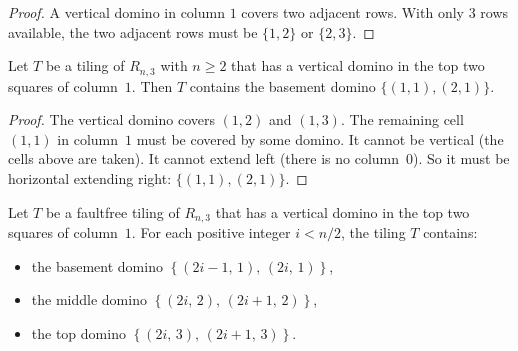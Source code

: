 \begin{proof}
\leanok
A vertical domino in column $1$ covers two adjacent rows.
With only $3$ rows available, the two adjacent rows must be
$\{1,2\}$ or $\{2,3\}$.
\end{proof}

\begin{lemma}
\label{lem.details.domino.base-case-basement}
\leanhelper
\leanok
Let $T$ be a tiling of $R_{n,3}$ with $n \ge 2$ that has a vertical domino in the
top two squares of column~$1$. Then $T$ contains the basement domino
$\{(1,1),(2,1)\}$.
\end{lemma}

\begin{proof}
\leanok
The vertical domino covers $(1,2)$ and $(1,3)$. The remaining cell
$(1,1)$ in column~$1$ must be covered by some domino.
It cannot be vertical (the cells above are taken).
It cannot extend left (there is no column~$0$).
So it must be horizontal extending right: $\{(1,1),(2,1)\}$.
\end{proof}

\begin{lemma}[Claim 1]
\label{lem.details.domino.claim1}
\leanhelper
\leanok
Let $T$ be a faultfree tiling of $R_{n,3}$ that has a vertical domino in the
top two squares of column~$1$.
For each positive integer $i < n/2$, the tiling $T$ contains:
\begin{itemize}
\item the basement domino $\left\{(2i-1,\, 1),\, (2i,\, 1)\right\}$,
\item the middle domino $\left\{(2i,\, 2),\, (2i+1,\, 2)\right\}$,
\item the top domino $\left\{(2i,\, 3),\, (2i+1,\, 3)\right\}$.
\end{itemize}
\end{lemma}

